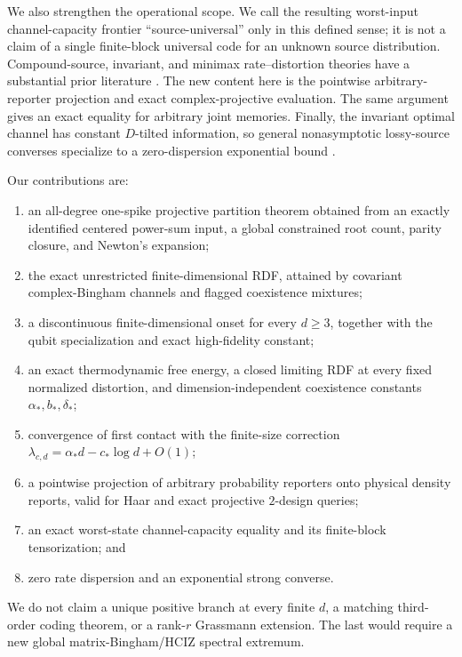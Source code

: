 \documentclass[11pt,a4paper]{article}
\theoremstyle{remark}
\begin{document}
We also strengthen the operational scope.  We call the resulting
worst-input channel-capacity frontier ``source-universal'' only in this defined
sense; it is not a claim of a single finite-block universal code for an
unknown source distribution.  Compound-source, invariant, and minimax
rate--distortion theories have a substantial prior literature
\cite{Sakrison1969,Harremoes2009CompactGroups,MahmoodWagner2022}.  The new
content here is the pointwise arbitrary-reporter projection and exact
complex-projective evaluation.  The same argument gives an exact equality for
arbitrary joint memories.  Finally, the invariant optimal channel has
constant $D$-tilted information, so general nonasymptotic lossy-source
converses specialize to a zero-dispersion exponential bound
\cite{KostinaVerdu2012}.

Our contributions are:

\begin{enumerate}[leftmargin=2em]
\item an all-degree one-spike projective partition theorem obtained from an
      exactly identified centered power-sum input, a global constrained root
      count, parity closure, and Newton's expansion;
\item the exact unrestricted finite-dimensional RDF, attained by covariant
      complex-Bingham channels and flagged coexistence mixtures;
\item a discontinuous finite-dimensional onset for every $d\ge3$, together
      with the qubit specialization and exact high-fidelity constant;
\item an exact thermodynamic free energy, a closed limiting RDF at every fixed
      normalized distortion, and dimension-independent coexistence constants
      $\alpha_*,b_*,\delta_*$;
\item convergence of first contact with the finite-size correction
      $\lambda_{c,d}=\alpha_*d-c_*\log d+O(1)$;
\item a pointwise projection of arbitrary probability reporters onto physical
      density reports, valid for Haar and exact projective $2$-design queries;
\item an exact worst-state channel-capacity equality and its finite-block
      tensorization; and
\item zero rate dispersion and an exponential strong converse.
\end{enumerate}

We do not claim a unique positive branch at every finite $d$, a matching
third-order coding theorem, or a rank-$r$ Grassmann extension.  The last would
require a new global matrix-Bingham/HCIZ spectral extremum.
\end{document}
